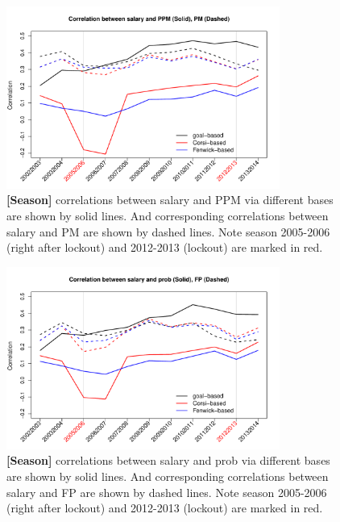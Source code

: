 \begin{figure}[htb!]
    \centering
    \includegraphics[width=0.8\textwidth]{figures/ppmpmsal-corr-season.pdf}
    \caption{\textbf{[Season]} correlations between salary and PPM via different bases are shown by solid lines. And corresponding correlations between salary and PM are shown by dashed lines. Note season 2005-2006 (right after lockout) and 2012-2013 (lockout) are marked in red. }\label{fig:ppmpmsal-corr-season}
\end{figure}

\begin{figure}[htb!]
	\centering
	\includegraphics[width=0.8\textwidth]{figures/probfpsal-corr-season.pdf}
	\caption{\textbf{[Season]} correlations between salary and prob via different bases are shown by solid lines. And corresponding correlations between salary and FP are shown by dashed lines. Note season 2005-2006 (right after lockout) and 2012-2013 (lockout) are marked in red. }\label{fig:probfpsal-corr-season}
\end{figure}

